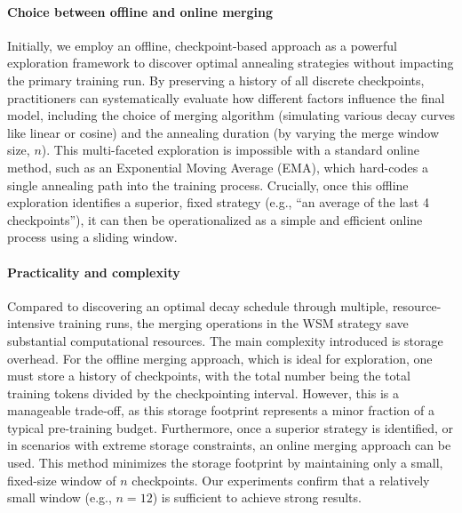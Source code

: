 \paragraph{Choice between offline and online merging}
Initially, we employ an offline, checkpoint-based approach as a powerful exploration framework to discover optimal annealing strategies without impacting the primary training run. By preserving a history of all discrete checkpoints, practitioners can systematically evaluate how different factors influence the final model, including the choice of merging algorithm (simulating various decay curves like linear or cosine) and the annealing duration (by varying the merge window size, $n$). This multi-faceted exploration is impossible with a standard online method, such as an Exponential Moving Average (EMA), which hard-codes a single annealing path into the training process. Crucially, once this offline exploration identifies a superior, fixed strategy (e.g., ``an average of the last 4 checkpoints''), it can then be operationalized as a simple and efficient online process using a sliding window.

\paragraph{Practicality and complexity}
Compared to discovering an optimal decay schedule through multiple, resource-intensive training runs, the merging operations in the WSM strategy save substantial computational resources. The main complexity introduced is storage overhead. For the offline merging approach, which is ideal for exploration, one must store a history of checkpoints, with the total number being the total training tokens divided by the checkpointing interval. However, this is a manageable trade-off, as this storage footprint represents a minor fraction of a typical pre-training budget. Furthermore, once a superior strategy is identified, or in scenarios with extreme storage constraints, an online merging approach can be used. This method minimizes the storage footprint by maintaining only a small, fixed-size window of $n$ checkpoints. Our experiments confirm that a relatively small window (e.g., $n=12$) is sufficient to achieve strong results.

